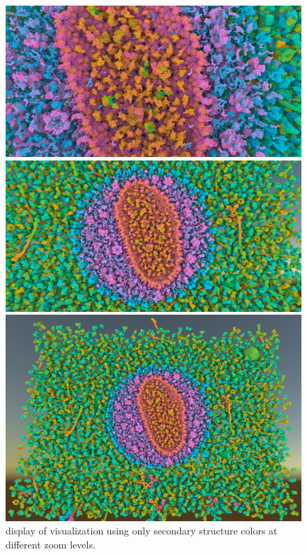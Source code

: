 \documentclass{article}
\begin{document}
	\begin{figure}[t]
		\centering
		\includegraphics[width=0.95\linewidth,keepaspectratio]{supplementaryMaterial/secondaryzoomedmiddle} 
		
		\vspace{0.1cm}
		
		\includegraphics[width=0.95\linewidth,keepaspectratio]{supplementaryMaterial/secondaryzoomedhiv} 
		
		\vspace{0.1cm}
		
		\includegraphics[width=0.8\linewidth,keepaspectratio]{supplementaryMaterial/secondaryzoomedfull} 
		\caption{display of visualization using only secondary structure colors at different zoom levels.}
	\end{figure}
	
\end{document}
